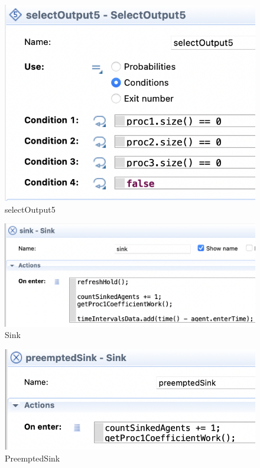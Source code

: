 \documentclass[14pt, a4paper, titlepage]{extarticle}
\begin{document}
	\begin{figure}[H]
		\centering
		\includegraphics[width=.9\textwidth]{selectOutput5}
		\caption{selectOutput5}
	\end{figure}

	\begin{figure}[H]
		\centering
		\includegraphics[width=.9\textwidth]{sink}
		\caption{Sink}
	\end{figure}

	\begin{figure}[H]
		\centering
		\includegraphics[width=.9\textwidth]{preemptedSink}
		\caption{PreemptedSink}
	\end{figure}
\end{document}
